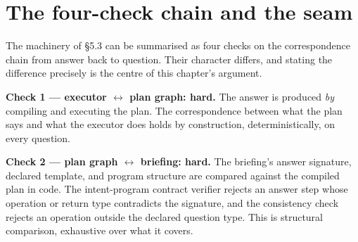 \documentclass[10pt]{article} %
\begin{document}
\section{The four-check chain and the seam}\label{sec:the-four-check-chain-and-the-seam}

The machinery of \S5.3 can be summarised as four checks on the correspondence chain from answer back to question. Their character differs, and stating the difference precisely is the centre of this chapter's argument.

\textbf{Check 1 --- executor $\leftrightarrow$ plan graph: hard.} The answer is produced \emph{by} compiling and executing the plan. The correspondence between what the plan says and what the executor does holds by construction, deterministically, on every question.

\textbf{Check 2 --- plan graph $\leftrightarrow$ briefing: hard.} The briefing's answer signature, declared template, and program structure are compared against the compiled plan in code. The intent-program contract verifier rejects an answer step whose operation or return type contradicts the signature, and the consistency check rejects an operation outside the declared question type. This is structural comparison, exhaustive over what it covers.
\end{document}
